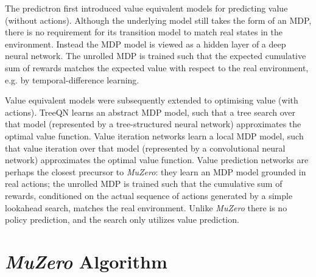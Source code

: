 \documentclass{article}
\newcommand{\muzero}{\emph{MuZero}}
\begin{document}
The predictron \cite{silver:predictron} first introduced value equivalent models for predicting value (without actions). Although the underlying model still takes the form of an MDP, there is no requirement for its transition model to match real states in the environment. Instead the MDP model is viewed as a hidden layer of a deep neural network. The unrolled MDP is trained such that the expected cumulative sum of rewards matches the expected value with respect to the real environment, e.g. by temporal-difference learning.

Value equivalent models were subsequently extended to optimising value (with actions). TreeQN \cite{farquhar:treeqn} learns an abstract MDP model, such that a tree search over that model (represented by a tree-structured neural network) approximates the optimal value function. Value iteration networks \cite{aviv:vin} learn a local MDP model, such that value iteration over that model (represented by a convolutional neural network) approximates the optimal value function. Value prediction networks \cite{oh:vpn} are perhaps the closest precursor to \muzero{}: they learn an MDP model grounded in real actions; the unrolled MDP is trained such that the cumulative sum of rewards, conditioned on the actual sequence of actions generated by a simple lookahead search, matches the real environment. Unlike \muzero{} there is no policy prediction, and the search only utilizes value prediction.

\section{\muzero{} Algorithm}
\end{document}
